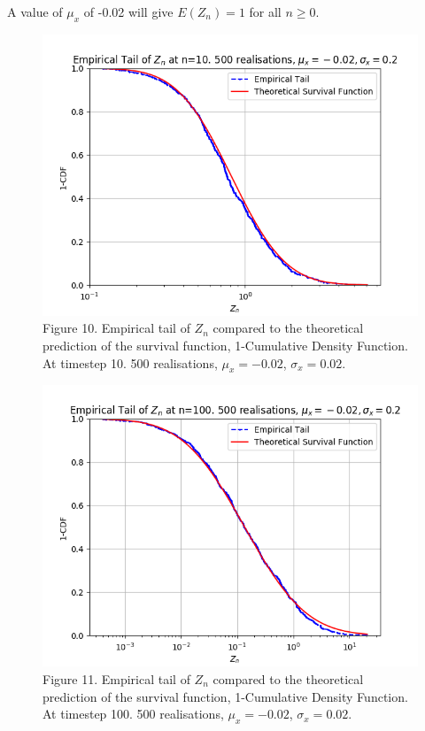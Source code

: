 \documentclass{article}
\begin{document}
A value of $\mu_x$ of -0.02 will give $E(Z_n)=1$ for all $n \geq 0$.

\begin{figure}[H]
\includegraphics[scale=0.8]{empirical_tail_10_a.png} 
\small{Figure 10. Empirical tail of $Z_n$ compared to the theoretical prediction of the survival function, 1-Cumulative Density Function. At timestep 10. 500 realisations, $\mu_x=-0.02$, $\sigma_x=0.02$.}
\end{figure}


\begin{figure}[H]
\includegraphics[scale=0.8]{empirical_tail_100_a.png} 
\small{Figure 11. Empirical tail of $Z_n$ compared to the theoretical prediction of the survival function, 1-Cumulative Density Function. At timestep 100. 500 realisations, $\mu_x=-0.02$, $\sigma_x=0.02$.}
\end{figure}
\end{document}
